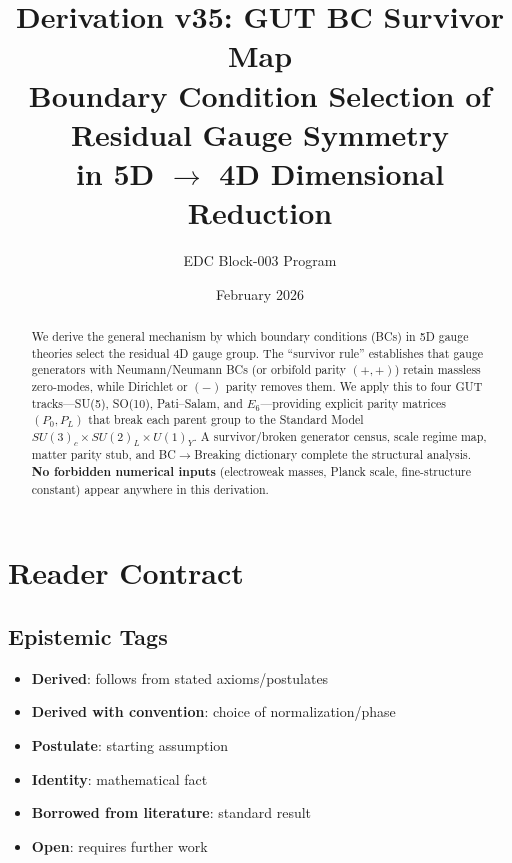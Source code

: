 \documentclass[11pt,a4paper]{article}
\title{\textbf{Derivation v35: GUT BC Survivor Map} \\[0.5em]
\large Boundary Condition Selection of Residual Gauge Symmetry \\
in 5D $\to$ 4D Dimensional Reduction}
\author{EDC Block-003 Program}
\date{February 2026}
\newcommand{\tagD}{\textcolor{blue!70!black}{[D]}}
\newcommand{\tagDc}{\textcolor{blue!50!black}{[Dc]}}
\newcommand{\tagP}{\textcolor{green!50!black}{[P]}}
\newcommand{\tagI}{\textcolor{gray}{[I]}}
\newcommand{\tagBL}{\textcolor{purple}{[BL]}}
\newcommand{\tagOPEN}{\textcolor{red!70!black}{[OPEN]}}
\begin{document}
\maketitle

\begin{abstract}
We derive the general mechanism by which boundary conditions (BCs) in 5D gauge
theories select the residual 4D gauge group. The ``survivor rule'' establishes
that gauge generators with Neumann/Neumann BCs (or orbifold parity $(+,+)$)
retain massless zero-modes, while Dirichlet or $(-)$ parity removes them.
We apply this to four GUT tracks---SU(5), SO(10), Pati--Salam, and $E_6$---providing
explicit parity matrices $(P_0, P_L)$ that break each parent group to the
Standard Model $SU(3)_c \times SU(2)_L \times U(1)_Y$. A survivor/broken
generator census, scale regime map, matter parity stub, and BC$\to$Breaking
dictionary complete the structural analysis. \textbf{No forbidden numerical
inputs} (electroweak masses, Planck scale, fine-structure constant) appear
anywhere in this derivation.
\end{abstract}

\tableofcontents
\newpage

\section{Reader Contract}

\subsection{Epistemic Tags}
\begin{itemize}[leftmargin=2cm]
    \item[\tagD] \textbf{Derived}: follows from stated axioms/postulates
    \item[\tagDc] \textbf{Derived with convention}: choice of normalization/phase
    \item[\tagP] \textbf{Postulate}: starting assumption
    \item[\tagI] \textbf{Identity}: mathematical fact
    \item[\tagBL] \textbf{Borrowed from literature}: standard result
    \item[\tagOPEN] \textbf{Open}: requires further work
\end{itemize}
\end{document}
